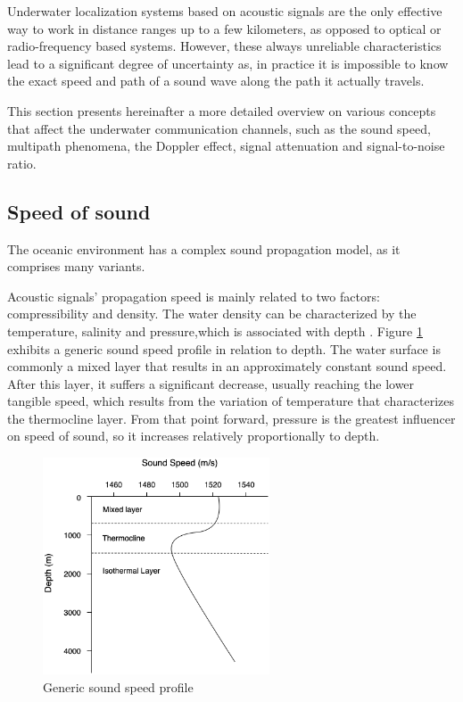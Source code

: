 Underwater localization systems based on acoustic signals are the only effective way to work in distance ranges up to a few kilometers, as opposed to optical or radio-frequency based systems. However, these always unreliable characteristics lead to a significant degree of uncertainty as, in practice it is impossible to know the exact speed and path of a sound wave along the path it actually travels.

This section presents hereinafter a more detailed overview on various concepts that affect the underwater communication channels, such as the sound speed, multipath phenomena, the Doppler effect, signal attenuation and signal-to-noise ratio.

\subsection{Speed of sound} \label{subsec: speed-sound}

The oceanic environment has a complex sound propagation model, as it comprises many variants.

Acoustic signals' propagation speed is mainly related to two factors: compressibility and density. The water density can be characterized by the temperature, salinity and pressure,which is associated with depth \cite{ocean-acoust}. Figure \ref{fig:spd-sound} exhibits a generic sound speed profile in relation to depth. The water surface is commonly a mixed layer that results in an approximately constant sound speed. After this layer, it suffers a significant decrease, usually reaching the lower tangible speed, which results from the variation of temperature that characterizes the thermocline layer. From that point forward, pressure is the greatest influencer on speed of sound, so it increases relatively proportionally to depth.

\begin{figure}[!htbp]
	\centering
	\includegraphics[width=0.6\textwidth]{figures/sound-profile}
	\caption{Generic sound speed profile}
	\label{fig:spd-sound}
\end{figure}

